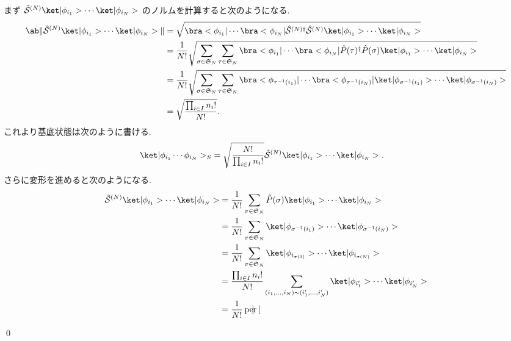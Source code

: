 \documentclass[uplatex,dvipdfmx,a4paper,11pt]{jlreq}
\makeatletter
\DeclareMathOperator{\per}{per}
\renewcommand{\SS}{\mathfrak{S}}
\renewcommand{\S}{\mathcal{S}}
\numberwithin{equation}{section}
\theoremstyle{definition}
\renewenvironment{proof}[1][\proofname]{\par
  \normalfont
  \topsep6\p@\@plus6\p@ \trivlist
  \item[\hskip\labelsep{\bfseries #1}\@addpunct{\bfseries}]\ignorespaces\quad\par
}{
  \qed\endtrivlist\@endpefalse
}
\renewcommand\proofname{証明}
\makeatother
\begin{document}
\begin{proof}
  まず $\hat{\S}^{(N)}\ket|\phi_{i_1}>\cdots\ket|\phi_{i_N}>$ のノルムを計算すると次のようになる.
  \begin{align}
    \ab\|\hat{\S}^{(N)}\ket|\phi_{i_1}>\cdots\ket|\phi_{i_N}>\| & = \sqrt{\bra<\phi_{i_1}|\cdots\bra<\phi_{i_N}|\hat{\S}^{(N)\dagger}\hat{\S}^{(N)}\ket|\phi_{i_1}>\cdots\ket|\phi_{i_N}>}                                                                  \\
                                                                & = \frac{1}{N!}\sqrt{\sum_{\sigma\in\SS_N}\sum_{\tau\in\SS_N}\bra<\phi_{i_1}|\cdots\bra<\phi_{i_N}|\hat{P}(\tau)^\dagger\hat{P}(\sigma)\ket|\phi_{i_1}>\cdots\ket|\phi_{i_N}>}             \\
                                                                & = \frac{1}{N!}\sqrt{\sum_{\sigma\in\SS_N}\sum_{\tau\in\SS_N}\bra<\phi_{\tau^{-1}(i_1)}|\cdots\bra<\phi_{\tau^{-1}(i_N)}|\ket|\phi_{\sigma^{-1}(i_1)}>\cdots\ket|\phi_{\sigma^{-1}(i_N)}>} \\
                                                                & = \sqrt{\frac{\prod_{i\in I}n_i!}{N!}}.
  \end{align}
  これより基底状態は次のように書ける.
  \begin{align}
    \ket|\phi_{i_1}\cdots\phi_{i_N}>_S & = \sqrt{\frac{N!}{\prod_{i\in I}n_i!}}\hat{\S}^{(N)}\ket|\phi_{i_1}>\cdots\ket|\phi_{i_N}>.
  \end{align}
  さらに変形を進めると次のようになる.
  \begin{align}
    \hat{\S}^{(N)}\ket|\phi_{i_1}>\cdots\ket|\phi_{i_N}> & = \frac{1}{N!}\sum_{\sigma\in\SS_N}\hat{P}(\sigma)\ket|\phi_{i_1}>\cdots\ket|\phi_{i_N}>                             \\
                                                         & = \frac{1}{N!}\sum_{\sigma\in\SS_N}\ket|\phi_{\sigma^{-1}(i_1)}>\cdots\ket|\phi_{\sigma^{-1}(i_N)}>                  \\
                                                         & = \frac{1}{N!}\sum_{\sigma\in\SS_N}\ket|\phi_{i_{\sigma(1)}}>\cdots\ket|\phi_{i_{\sigma(N)}}>                        \\
                                                         & = \frac{\prod_{i\in I}n_i!}{N!}\sum_{(i_1,\ldots,i_N)\sim(i_1',\ldots,i_N')}\ket|\phi_{i_1'}>\cdots\ket|\phi_{i_N'}> \\
                                                         & = \frac{1}{N!}\per\begin{bmatrix}

\end{bmatrix}
\end{align}
\end{proof}
\end{document}
